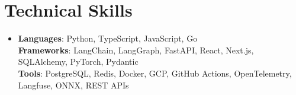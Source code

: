 \documentclass[letterpaper,11pt]{article}
\begin{document}
\section{Technical Skills}
\begin{itemize}[leftmargin=0.15in, label={}, topsep=0pt, itemsep=0pt, parsep=0pt, partopsep=0pt]
  \item{\fontsize{9.6pt}{10.0pt}\selectfont
   \textbf{Languages}{: Python, TypeScript, JavaScript, Go} \\
   \textbf{Frameworks}{: LangChain, LangGraph, FastAPI, React, Next.js, SQLAlchemy, PyTorch, Pydantic} \\
   \textbf{Tools}{: PostgreSQL, Redis, Docker, GCP, GitHub Actions, OpenTelemetry, Langfuse, ONNX, REST APIs} \\
  }
\end{itemize}
\end{document}

